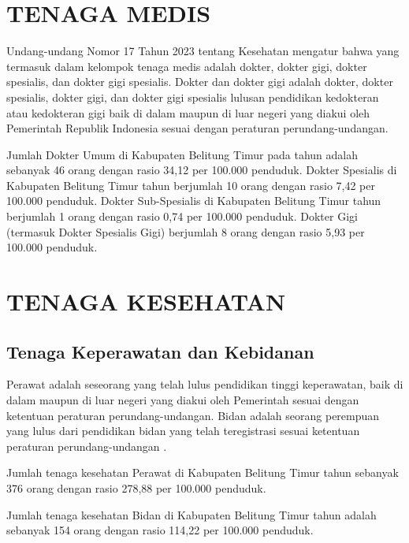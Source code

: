 \section{TENAGA MEDIS}
Undang-undang Nomor 17 Tahun 2023 tentang Kesehatan mengatur bahwa yang termasuk dalam kelompok tenaga medis adalah dokter, dokter gigi, dokter spesialis, dan dokter gigi spesialis.
Dokter dan dokter gigi adalah dokter, dokter spesialis, dokter gigi, dan dokter gigi spesialis lulusan pendidikan kedokteran atau kedokteran gigi baik di dalam maupun di luar negeri yang diakui oleh Pemerintah Republik Indonesia sesuai dengan peraturan perundang-undangan.

Jumlah Dokter Umum di Kabupaten Belitung Timur pada tahun \tP adalah sebanyak 46 orang dengan rasio 34,12 per 100.000 penduduk.
Dokter Spesialis di Kabupaten Belitung Timur tahun \tP berjumlah 10 orang dengan rasio 7,42 per 100.000 penduduk.
Dokter Sub-Spesialis di Kabupaten Belitung Timur tahun \tP berjumlah 1 orang dengan rasio 0,74 per 100.000 penduduk.
Dokter Gigi (termasuk Dokter Spesialis Gigi) berjumlah 8 orang dengan rasio 5,93 per 100.000 penduduk.

\section{TENAGA KESEHATAN}
\subsection{Tenaga Keperawatan dan Kebidanan}
Perawat adalah seseorang yang telah lulus pendidikan tinggi keperawatan, baik di dalam maupun di luar negeri yang diakui oleh Pemerintah sesuai dengan ketentuan peraturan perundang-undangan.
Bidan adalah seorang perempuan yang lulus dari pendidikan bidan yang telah teregistrasi sesuai ketentuan peraturan perundang-undangan .

Jumlah tenaga kesehatan Perawat di Kabupaten Belitung Timur tahun \tP sebanyak 376 orang dengan rasio 278,88 per 100.000 penduduk.

Jumlah tenaga kesehatan Bidan di Kabupaten Belitung Timur tahun \tP adalah sebanyak 154 orang dengan rasio 114,22 per 100.000 penduduk.

